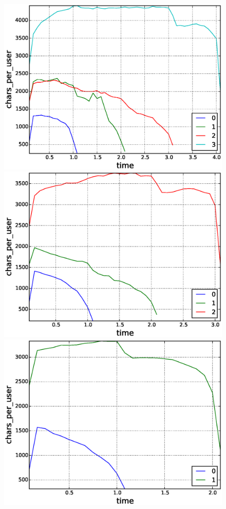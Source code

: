 \begin{figure}[!tb]
\includegraphics[scale=0.2]{./images/avr_comment_length_user_for_surviving_year_for_2011.eps}
\includegraphics[scale=0.2]{./images/avr_comment_length_user_for_surviving_year_for_2012.eps}
\includegraphics[scale=0.2]{./images/avr_comment_length_user_for_surviving_year_for_2013.eps}

\end{figure}
